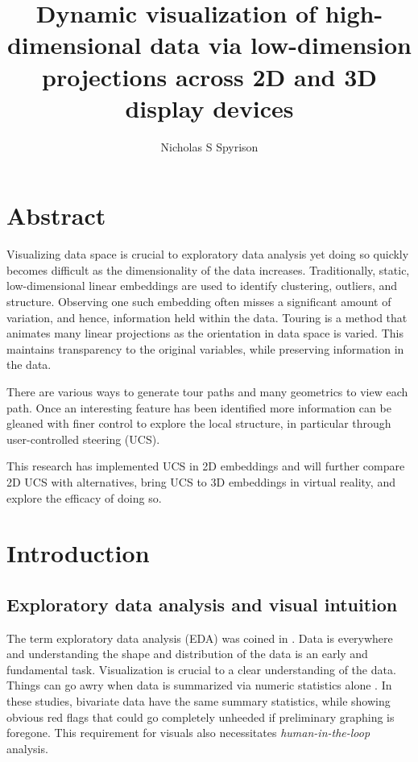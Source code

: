 \documentclass{monashthesis}
\author{Nicholas S Spyrison}
\title{Dynamic visualization of high-dimensional data via low-dimension
projections across 2D and 3D display devices}
\begin{document}

\titlepage

{\sf\tighttoc\doublespacing}

\chapter*{Abstract}\label{abstract}

Visualizing data space is crucial to exploratory data analysis yet doing
so quickly becomes difficult as the dimensionality of the data
increases. Traditionally, static, low-dimensional linear embeddings are
used to identify clustering, outliers, and structure. Observing one such
embedding often misses a significant amount of variation, and hence,
information held within the data. Touring is a method that animates many
linear projections as the orientation in data space is varied. This
maintains transparency to the original variables, while preserving
information in the data.

There are various ways to generate tour paths and many geometrics to
view each path. Once an interesting feature has been identified more
information can be gleaned with finer control to explore the local
structure, in particular through user-controlled steering (UCS).

This research has implemented UCS in 2D embeddings and will further
compare 2D UCS with alternatives, bring UCS to 3D embeddings in virtual
reality, and explore the efficacy of doing so.

\clearpage{}\setcounter{page}{0}

\chapter{Introduction}\label{ch:introduction}

\section{Exploratory data analysis and visual
intuition}\label{exploratory-data-analysis-and-visual-intuition}

The term exploratory data analysis (EDA) was coined in
\textcite{tukey_exploratory_1977}. Data is everywhere and understanding
the shape and distribution of the data is an early and fundamental task.
Visualization is crucial to a clear understanding of the data. Things
can go awry when data is summarized via numeric statistics alone
\autocites{anscombe_graphs_1973}{matejka_same_2017}. In these studies,
bivariate data have the same summary statistics, while showing obvious
red flags that could go completely unheeded if preliminary graphing is
foregone. This requirement for visuals also necessitates
\emph{human-in-the-loop} analysis.
\end{document}
